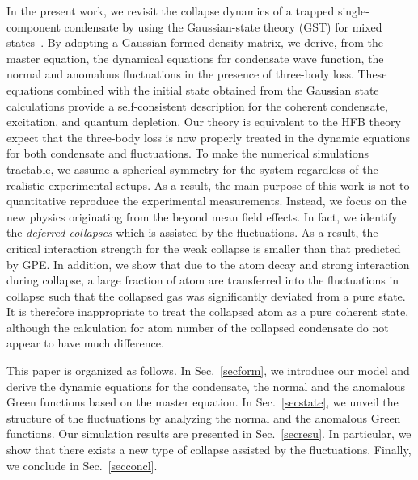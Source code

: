 \documentclass[pra,twocolumn,preprintnumbers,superscriptaddress,longbibliography,showkeys]{revtex4-1}
\begin{document}
In the present work, we revisit the collapse dynamics of a trapped single-component condensate by using the Gaussian-state theory (GST) for mixed states~\cite{quannon}. By adopting a Gaussian formed density matrix, we derive, from the master equation, the dynamical equations for condensate wave function, the normal and anomalous fluctuations in the presence of three-body loss. These equations combined with the initial state obtained from the Gaussian state calculations provide a self-consistent description for the coherent condensate, excitation, and quantum depletion. Our theory is equivalent to the HFB theory expect that the three-body loss is now properly treated in the dynamic equations for both condensate and fluctuations. To make the numerical simulations tractable, we assume a spherical symmetry for the system regardless of the realistic experimental setups. As a result, the main purpose of this work is not to quantitative reproduce the experimental measurements. Instead, we focus on the new physics originating from the beyond mean field effects. In fact, we identify the {\em deferred collapses} which is assisted by the fluctuations. As a result, the critical interaction strength for the weak collapse is smaller than that predicted by GPE. In addition, we show that due to the atom decay and strong interaction during collapse, a large fraction of atom are transferred into the fluctuations in collapse such that the collapsed gas was significantly deviated from a pure state. It is therefore inappropriate to treat the collapsed atom as a pure coherent state, although the calculation for atom number of the collapsed condensate do not appear to have much difference.

This paper is organized as follows. In Sec.~\ref{secform}, we introduce our model and derive the dynamic equations for the condensate, the normal and the anomalous Green functions based on the master equation. In Sec.~\ref{secstate}, we unveil the structure of the fluctuations by analyzing the normal and the anomalous Green functions. Our simulation results are presented in Sec.~\ref{secresu}. In particular, we show that there exists a new type of collapse assisted by the fluctuations. Finally, we conclude in Sec.~\ref{secconcl}.
\end{document}
